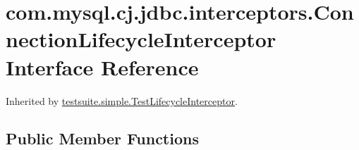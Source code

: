 \hypertarget{interfacecom_1_1mysql_1_1cj_1_1jdbc_1_1interceptors_1_1_connection_lifecycle_interceptor}{}\section{com.\+mysql.\+cj.\+jdbc.\+interceptors.\+Connection\+Lifecycle\+Interceptor Interface Reference}
\label{interfacecom_1_1mysql_1_1cj_1_1jdbc_1_1interceptors_1_1_connection_lifecycle_interceptor}


Inherited by \mbox{\hyperlink{classtestsuite_1_1simple_1_1_test_lifecycle_interceptor}{testsuite.\+simple.\+Test\+Lifecycle\+Interceptor}}.

\subsection*{Public Member Functions}
